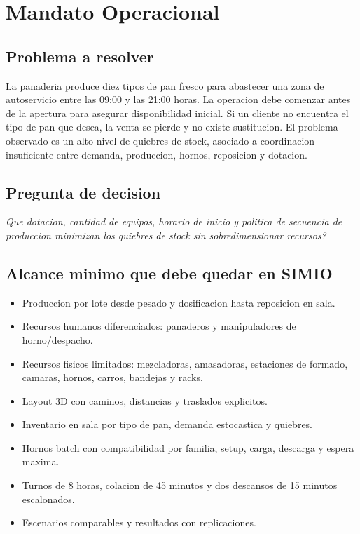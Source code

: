 \documentclass[12pt]{article}
\begin{document}
\section{Mandato Operacional}

\subsection{Problema a resolver}

La panaderia produce diez tipos de pan fresco para abastecer una zona de autoservicio entre las 09:00 y las 21:00 horas. La operacion debe comenzar antes de la apertura para asegurar disponibilidad inicial. Si un cliente no encuentra el tipo de pan que desea, la venta se pierde y no existe sustitucion. El problema observado es un alto nivel de quiebres de stock, asociado a coordinacion insuficiente entre demanda, produccion, hornos, reposicion y dotacion.

\subsection{Pregunta de decision}

\begin{center}
\colorbox{azulclaro}{%
\parbox{0.9\textwidth}{%
\centering
\textit{Que dotacion, cantidad de equipos, horario de inicio y politica de secuencia de produccion minimizan los quiebres de stock sin sobredimensionar recursos?}
}}
\end{center}

\subsection{Alcance minimo que debe quedar en SIMIO}

\begin{itemize}
  \item Produccion por lote desde pesado y dosificacion hasta reposicion en sala.
  \item Recursos humanos diferenciados: panaderos y manipuladores de horno/despacho.
  \item Recursos fisicos limitados: mezcladoras, amasadoras, estaciones de formado, camaras, hornos, carros, bandejas y racks.
  \item Layout 3D con caminos, distancias y traslados explicitos.
  \item Inventario en sala por tipo de pan, demanda estocastica y quiebres.
  \item Hornos batch con compatibilidad por familia, setup, carga, descarga y espera maxima.
  \item Turnos de 8 horas, colacion de 45 minutos y dos descansos de 15 minutos escalonados.
  \item Escenarios comparables y resultados con replicaciones.
\end{itemize}
\end{document}
